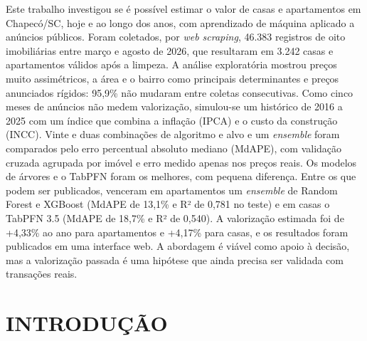 \documentclass[
  article,
  a4paper,
  12pt,
  fleqn,
  oneside,
  chapter = TITLE,
  section = TITLE,
]{abntex2}
\affil{Graduanda em Sistemas de Informação pela UNOESC; Chapecó}%
\affil{Professor orientador do curso de Sistemas de Informação da UNOESC; Chapecó}%
\begin{document}
\pretextual

\begin{paginadetitulo}


    \begin{ambienteresumo}
    Este trabalho investigou se é possível estimar o valor de casas e apartamentos em Chapecó/SC, hoje e ao longo dos anos, com aprendizado de máquina aplicado a anúncios públicos. Foram coletados, por \textit{web scraping}, 46.383 registros de oito imobiliárias entre março e agosto de 2026, que resultaram em 3.242 casas e apartamentos válidos após a limpeza. A análise exploratória mostrou preços muito assimétricos, a área e o bairro como principais determinantes e preços anunciados rígidos: 95,9\% não mudaram entre coletas consecutivas. Como cinco meses de anúncios não medem valorização, simulou-se um histórico de 2016 a 2025 com um índice que combina a inflação (IPCA) e o custo da construção (INCC). Vinte e duas combinações de algoritmo e alvo e um \textit{ensemble} foram comparados pelo erro percentual absoluto mediano (MdAPE), com validação cruzada agrupada por imóvel e erro medido apenas nos preços reais. Os modelos de árvores e o TabPFN foram os melhores, com pequena diferença. Entre os que podem ser publicados, venceram em apartamentos um \textit{ensemble} de Random Forest e XGBoost (MdAPE de 13,1\% e R² de 0,781 no teste) e em casas o TabPFN 3.5 (MdAPE de 18,7\% e R² de 0,540). A valorização estimada foi de +4,33\% ao ano para apartamentos e +4,17\% para casas, e os resultados foram publicados em uma interface web. A abordagem é viável como apoio à decisão, mas a valorização passada é uma hipótese que ainda precisa ser validada com transações reais.

    \end{ambienteresumo}

\end{paginadetitulo}

\textual

\section{INTRODUÇÃO}\label{sec:intro}
\end{document}
